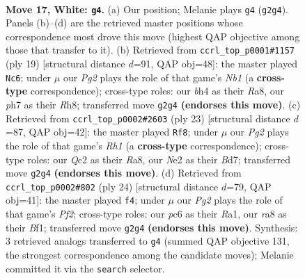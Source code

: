 \documentclass[11pt]{article}
\begin{document}
\clearpage

\begin{figure}[p]\centering
\begin{subfigure}{0.46\textwidth}\centering
\resizebox{\linewidth}{!}{%
\newchessgame
\chessboard[
  setfen={rnbq2k1/pp5p/2p1r2p/3p1p2/PP1P3b/2N1PP1P/2QKN1P1/R4B1R w - - 0 17},
  showmover=false,
  pgfstyle=straightmove, color=movearrow, markmove={g2-g4}
]}
\caption{}
\end{subfigure}\hfill
\begin{subfigure}{0.46\textwidth}\centering
\resizebox{\linewidth}{!}{%
\newchessgame
\chessboard[
  setfen={rn1qk2r/1p2bppp/p2p1n2/4pP2/4P3/1PN4P/1PP3P1/R1BQKB1R b KQkq - 0 10},
  showmover=false,
  pgfstyle=straightmove, color=movearrow, markmove={b8-c6}
]}
\caption{}
\end{subfigure}
\\[4pt]
\begin{subfigure}{0.46\textwidth}\centering
\resizebox{\linewidth}{!}{%
\newchessgame
\chessboard[
  setfen={r3k2r/pp1bnppp/2n1p3/3pP2B/q1pP3P/P1P5/2PBNPP1/RQ2K2R b KQkq - 2 12},
  showmover=false,
  pgfstyle=straightmove, color=movearrow, markmove={h8-f8}
]}
\caption{}
\end{subfigure}\hfill
\begin{subfigure}{0.46\textwidth}\centering
\resizebox{\linewidth}{!}{%
\newchessgame
\chessboard[
  setfen={r1b1k2r/1pp1bp1p/n6q/p2Ppp2/2P5/2N3P1/PPQ1NP1P/R3KB1R w KQkq - 1 13},
  showmover=false,
  pgfstyle=straightmove, color=movearrow, markmove={f2-f4}
]}
\caption{}
\end{subfigure}
\caption{\textbf{Move 17, White: \texttt{g4}.} (a) Our position; Melanie plays \texttt{g4} (\texttt{g2g4}). Panels (b)--(d) are the retrieved master positions whose correspondence most drove this move (highest QAP objective among those that transfer to it). (b) Retrieved from \texttt{ccrl\_top\_p0001\#1157} (ply 19) [structural distance $d$=91, QAP obj=48]: the master played \texttt{Nc6}; under $\mu$ our \emph{Pg2} plays the role of that game's \emph{Nb1} (a \textbf{cross-type} correspondence); cross-type roles: our \emph{b}h4 as their \emph{R}a8, our \emph{p}h7 as their \emph{R}h8; transferred move \texttt{g2g4} \textbf{(endorses this move)}. (c) Retrieved from \texttt{ccrl\_top\_p0002\#2603} (ply 23) [structural distance $d$=87, QAP obj=42]: the master played \texttt{Rf8}; under $\mu$ our \emph{Pg2} plays the role of that game's \emph{Rh1} (a \textbf{cross-type} correspondence); cross-type roles: our \emph{Q}c2 as their \emph{R}a8, our \emph{N}e2 as their \emph{B}d7; transferred move \texttt{g2g4} \textbf{(endorses this move)}. (d) Retrieved from \texttt{ccrl\_top\_p0002\#802} (ply 24) [structural distance $d$=79, QAP obj=41]: the master played \texttt{f4}; under $\mu$ our \emph{Pg2} plays the role of that game's \emph{Pf2}; cross-type roles: our \emph{p}c6 as their \emph{R}a1, our \emph{r}a8 as their \emph{B}f1; transferred move \texttt{g2g4} \textbf{(endorses this move)}. Synthesis: 3 retrieved analogs transferred to \texttt{g4} (summed QAP objective 131, the strongest correspondence among the candidate moves); Melanie committed it via the \texttt{search} selector.}
\label{fig:thought-m32}
\end{figure}
\end{document}
